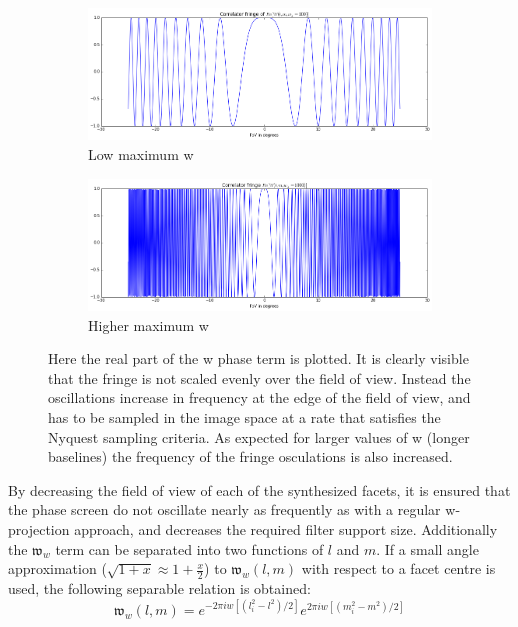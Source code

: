 \begin{figure}[h]
  \begin{mdframed}
    \centering
    \begin{subfigure}[b]{0.7\textwidth}
      \centering
      \includegraphics[width=\textwidth]{images/w_fringe_low_w.png}
      \caption{Low maximum w}
    \end{subfigure}  
    \begin{subfigure}[b]{0.7\textwidth}
      \centering
      \includegraphics[width=\textwidth]{images/w_fringe_high_w.png}
      \caption{Higher maximum w}
    \end{subfigure}
    \caption[w fringe in one dimension]{Here the real part of the w phase term is plotted. It is clearly visible that the fringe is not scaled evenly over the field of view.
	       Instead the oscillations increase in frequency at the edge of the field of view, and has to be sampled in the image space at a rate that
	       satisfies the Nyquest sampling criteria. As expected for larger values of w (longer baselines) the frequency of the fringe osculations is
	       also increased.}
    \label{fig_w_fringes}
  \end{mdframed}
\end{figure}

By decreasing the field of view of each of the synthesized facets, it is ensured that the phase screen do not oscillate nearly as frequently as with a regular w-projection approach,
and decreases the required filter support size. Additionally the $\mathfrak{w}_w$ term can be separated into two functions of $l$ and $m$. If a small angle 
approximation ($\sqrt{1+x}\approx1+\frac{x}{2}$) to $\mathfrak{w}_w(l,m)$ with respect to a facet centre is used, the following separable relation is obtained:
\begin{equation}
   \mathfrak{w}_w(l,m) = e^{-2{\pi}iw[(l_i^2-l^2)/2]}e^{2{\pi}iw[(m_i^2-m^2)/2]}
\end{equation}

